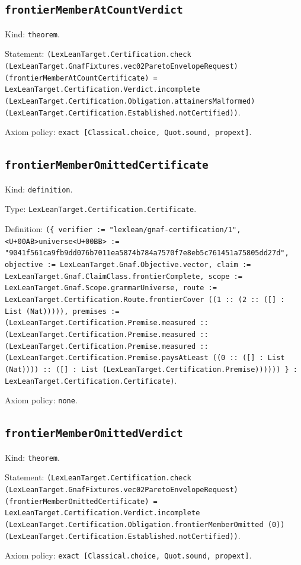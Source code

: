 \documentclass[11pt]{article}
\begin{document}
\subsection*{\texttt{frontierMemberAtCountVerdict}}
\noindent Kind: \texttt{theorem}.\par
\noindent Statement: \texttt{(LexLeanTarget.Certification.check (LexLeanTarget.GnafFixtures.vec02ParetoEnvelopeRequest) (frontierMemberAtCountCertificate) = LexLeanTarget.Certification.Verdict.incomplete (LexLeanTarget.Certification.Obligation.attainersMalformed) (LexLeanTarget.Certification.Established.notCertified))}.\par
\noindent Axiom policy: \texttt{exact [Classical.choice, Quot.sound, propext]}.\par
\subsection*{\texttt{frontierMemberOmittedCertificate}}
\noindent Kind: \texttt{definition}.\par
\noindent Type: \texttt{LexLeanTarget.Certification.Certificate}.\par
\noindent Definition: \texttt{(\{ verifier := "lexlean/gnaf-certification/1", <U+00AB>universe<U+00BB> := "9041f561ca9fb9dd076b7011ea5874b784a7570f7e8eb5c761451a75805dd27d", objective := LexLeanTarget.Gnaf.Objective.vector, claim := LexLeanTarget.Gnaf.ClaimClass.frontierComplete, scope := LexLeanTarget.Gnaf.Scope.grammarUniverse, route := LexLeanTarget.Certification.Route.frontierCover ((1 :: (2 :: ([] : List (Nat))))), premises := (LexLeanTarget.Certification.Premise.measured :: (LexLeanTarget.Certification.Premise.measured :: (LexLeanTarget.Certification.Premise.measured :: (LexLeanTarget.Certification.Premise.paysAtLeast ((0 :: ([] : List (Nat)))) :: ([] : List (LexLeanTarget.Certification.Premise)))))) \} : LexLeanTarget.Certification.Certificate)}.\par
\noindent Axiom policy: \texttt{none}.\par
\subsection*{\texttt{frontierMemberOmittedVerdict}}
\noindent Kind: \texttt{theorem}.\par
\noindent Statement: \texttt{(LexLeanTarget.Certification.check (LexLeanTarget.GnafFixtures.vec02ParetoEnvelopeRequest) (frontierMemberOmittedCertificate) = LexLeanTarget.Certification.Verdict.incomplete (LexLeanTarget.Certification.Obligation.frontierMemberOmitted (0)) (LexLeanTarget.Certification.Established.notCertified))}.\par
\noindent Axiom policy: \texttt{exact [Classical.choice, Quot.sound, propext]}.\par
\end{document}
